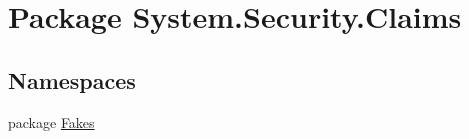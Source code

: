 \hypertarget{namespace_system_1_1_security_1_1_claims}{\section{Package System.\-Security.\-Claims}
\label{namespace_system_1_1_security_1_1_claims}
}
\subsection*{Namespaces}
\begin{DoxyCompactItemize}
\item 
package \hyperlink{namespace_system_1_1_security_1_1_claims_1_1_fakes}{Fakes}
\end{DoxyCompactItemize}
